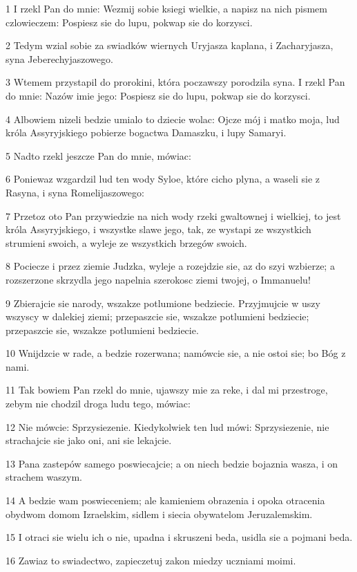 \par 1 I rzekl Pan do mnie: Wezmij sobie ksiegi wielkie, a napisz na nich pismem czlowieczem: Pospiesz sie do lupu, pokwap sie do korzysci.
\par 2 Tedym wzial sobie za swiadków wiernych Uryjasza kaplana, i Zacharyjasza, syna Jeberechyjaszowego.
\par 3 Wtemem przystapil do prorokini, która poczawszy porodzila syna. I rzekl Pan do mnie: Nazów imie jego: Pospiesz sie do lupu, pokwap sie do korzysci.
\par 4 Albowiem nizeli bedzie umialo to dziecie wolac: Ojcze mój i matko moja, lud króla Assyryjskiego pobierze bogactwa Damaszku, i lupy Samaryi.
\par 5 Nadto rzekl jeszcze Pan do mnie, mówiac:
\par 6 Poniewaz wzgardzil lud ten wody Syloe, które cicho plyna, a waseli sie z Rasyna, i syna Romelijaszowego:
\par 7 Przetoz oto Pan przywiedzie na nich wody rzeki gwaltownej i wielkiej, to jest króla Assyryjskiego, i wszystke slawe jego, tak, ze wystapi ze wszystkich strumieni swoich, a wyleje ze wszystkich brzegów swoich.
\par 8 Pociecze i przez ziemie Judzka, wyleje a rozejdzie sie, az do szyi wzbierze; a rozszerzone skrzydla jego napelnia szerokosc ziemi twojej, o Immanuelu!
\par 9 Zbierajcie sie narody, wszakze potlumione bedziecie. Przyjmujcie w uszy wszyscy w dalekiej ziemi; przepaszcie sie, wszakze potlumieni bedziecie; przepaszcie sie, wszakze potlumieni bedziecie.
\par 10 Wnijdzcie w rade, a bedzie rozerwana; namówcie sie, a nie ostoi sie; bo Bóg z nami.
\par 11 Tak bowiem Pan rzekl do mnie, ujawszy mie za reke, i dal mi przestroge, zebym nie chodzil droga ludu tego, mówiac:
\par 12 Nie mówcie: Sprzysiezenie. Kiedykolwiek ten lud mówi: Sprzysiezenie, nie strachajcie sie jako oni, ani sie lekajcie.
\par 13 Pana zastepów samego poswiecajcie; a on niech bedzie bojaznia wasza, i on strachem waszym.
\par 14 A bedzie wam poswieceniem; ale kamieniem obrazenia i opoka otracenia obydwom domom Izraelskim, sidlem i siecia obywatelom Jeruzalemskim.
\par 15 I otraci sie wielu ich o nie, upadna i skruszeni beda, usidla sie a pojmani beda.
\par 16 Zawiaz to swiadectwo, zapieczetuj zakon miedzy uczniami moimi.
